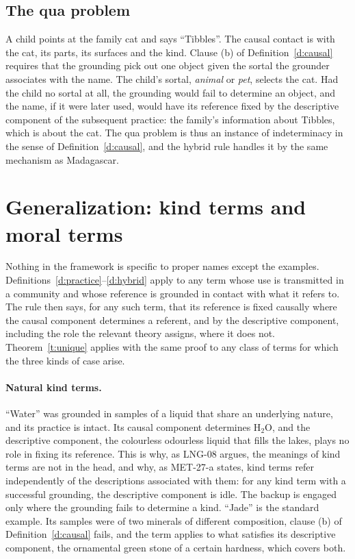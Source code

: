 \documentclass{situationist-preprint}
\begin{document}
\subsection{The qua problem}

A child points at the family cat and says \enquote{Tibbles}. The causal contact is with the cat, its parts, its surfaces and the kind. Clause (b) of Definition~\ref{d:causal} requires that the grounding pick out one object given the sortal the grounder associates with the name. The child's sortal, \emph{animal} or \emph{pet}, selects the cat. Had the child no sortal at all, the grounding would fail to determine an object, and the name, if it were later used, would have its reference fixed by the descriptive component of the subsequent practice: the family's information about Tibbles, which is about the cat. The qua problem is thus an instance of indeterminacy in the sense of Definition~\ref{d:causal}, and the hybrid rule handles it by the same mechanism as Madagascar.

\section{Generalization: kind terms and moral terms}

Nothing in the framework is specific to proper names except the examples. Definitions~\ref{d:practice}--\ref{d:hybrid} apply to any term whose use is transmitted in a community and whose reference is grounded in contact with what it refers to. The rule then says, for any such term, that its reference is fixed causally where the causal component determines a referent, and by the descriptive component, including the role the relevant theory assigns, where it does not. Theorem~\ref{t:unique} applies with the same proof to any class of terms for which the three kinds of case arise.

\paragraph{Natural kind terms.} \enquote{Water} was grounded in samples of a liquid that share an underlying nature, and its practice is intact. Its causal component determines H$_2$O, and the descriptive component, the colourless odourless liquid that fills the lakes, plays no role in fixing its reference. This is why, as LNG-08 argues, the meanings of kind terms are not in the head, and why, as MET-27-a states, kind terms refer independently of the descriptions associated with them: for any kind term with a successful grounding, the descriptive component is idle. The backup is engaged only where the grounding fails to determine a kind. \enquote{Jade} is the standard example. Its samples were of two minerals of different composition, clause (b) of Definition~\ref{d:causal} fails, and the term applies to what satisfies its descriptive component, the ornamental green stone of a certain hardness, which covers both.
\end{document}
